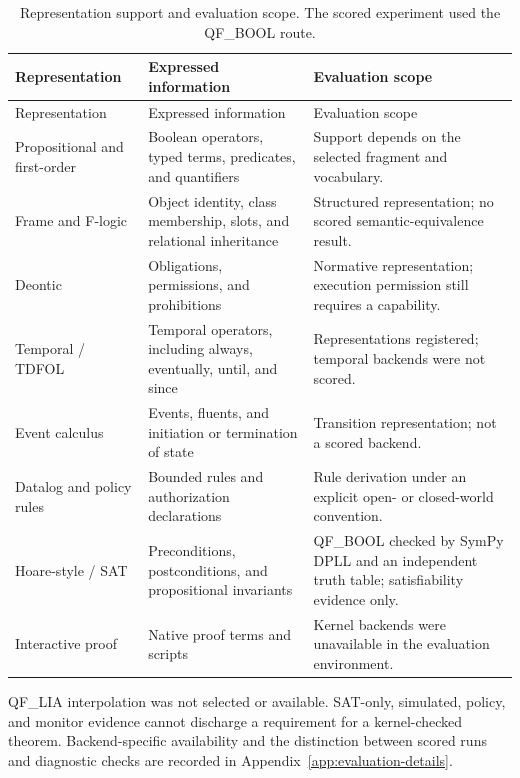 \begin{longtable}{@{}>{\raggedright\arraybackslash}p{.23\linewidth} >{\raggedright\arraybackslash}p{.36\linewidth} >{\raggedright\arraybackslash}p{.35\linewidth}@{}}
\caption{Representation support and evaluation scope. The scored experiment used the QF\_BOOL route.}\label{tab:B1}\\
\toprule
Representation & Expressed information & Evaluation scope \\
\midrule
\endfirsthead
\toprule
Representation & Expressed information & Evaluation scope \\
\midrule
\endhead
\bottomrule
\endlastfoot
Propositional and first-order & Boolean operators, typed terms, predicates, and quantifiers & Support depends on the selected fragment and vocabulary. \\[4pt]
Frame and F-logic & Object identity, class membership, slots, and relational inheritance & Structured representation; no scored semantic-equivalence result. \\[4pt]
Deontic & Obligations, permissions, and prohibitions & Normative representation; execution permission still requires a capability. \\[4pt]
Temporal / TDFOL & Temporal operators, including always, eventually, until, and since & Representations registered; temporal backends were not scored. \\[4pt]
Event calculus & Events, fluents, and initiation or termination of state & Transition representation; not a scored backend. \\[4pt]
Datalog and policy rules & Bounded rules and authorization declarations & Rule derivation under an explicit open- or closed-world convention. \\[4pt]
Hoare-style / SAT & Preconditions, postconditions, and propositional invariants & QF\_BOOL checked by SymPy DPLL and an independent truth table; satisfiability evidence only. \\[4pt]
Interactive proof & Native proof terms and scripts & Kernel backends were unavailable in the evaluation environment. \\
\end{longtable}

QF\_LIA interpolation was not selected or available. SAT-only, simulated, policy, and monitor evidence cannot discharge a requirement for a kernel-checked theorem. Backend-specific availability and the distinction between scored runs and diagnostic checks are recorded in Appendix~\ref{app:evaluation-details}.

